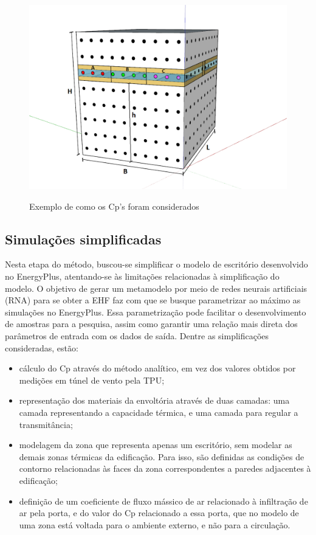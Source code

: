 \documentclass[brazil,hardcopy,openany,a5paper]{ufscthesis}
\begin{document}
		\begin{figure}[h]
			\centering
			\caption{Exemplo de como os Cp’s foram considerados}
			\includegraphics[width=1\linewidth]{img/ex_TPU_h.png}
			\label{fig:tpuwindows}
		\end{figure}
		
		
		\subsection{Simulações simplificadas}
		
		Nesta etapa do método, buscou-se simplificar o modelo de escritório desenvolvido no EnergyPlus, atentando-se às limitações relacionadas à simplificação do modelo.
		O objetivo de gerar um metamodelo por meio de redes neurais artificiais (RNA) para se obter a EHF faz com que se busque parametrizar ao máximo as simulações no EnergyPlus.
		Essa parametrização pode facilitar o desenvolvimento de amostras para a pesquisa, assim como garantir uma relação mais direta dos parâmetros de entrada com os dados de saída. 
		Dentre as simplificações consideradas, estão:
		
		\begin{itemize}
		\item cálculo do Cp através do método analítico, em vez dos valores obtidos por medições em túnel de vento pela TPU;
		\item representação dos materiais da envoltória através de duas camadas: uma camada representando a capacidade térmica, e uma camada para regular a transmitância;  %
		\item modelagem da zona que representa apenas um escritório, sem modelar as demais zonas térmicas da edificação. Para isso, são definidas as condições de contorno relacionadas às faces da zona correspondentes a paredes adjacentes à edificação;
		\item definição de um coeficiente de fluxo mássico de ar relacionado à infiltração de ar pela porta, e do valor do Cp relacionado a essa porta, que no modelo de uma zona está voltada para o ambiente externo, e não para a circulação.
		\end{itemize}
		
\end{document}
